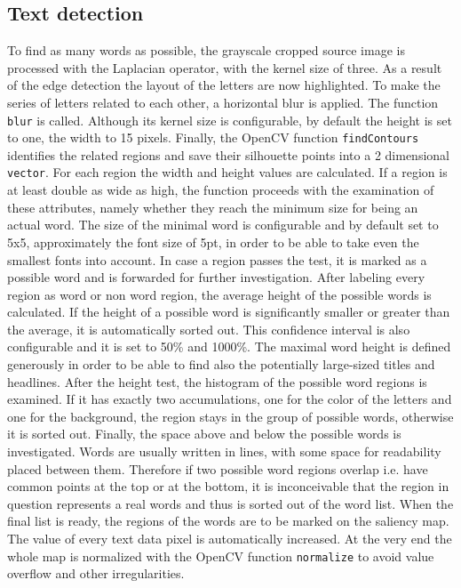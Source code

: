 \documentclass[draft,final]{vutinfth} %
\begin{document}
	\subsection{Text detection}
	To find as many words as possible, the grayscale cropped source image is processed with the Laplacian operator, with the kernel size of three.
	As a result of the edge detection the layout of the letters are now highlighted.
	To make the series of letters related to each other, a horizontal blur is applied.
	The function \texttt{blur} is called. 
	Although its kernel size is configurable, by default the height is set to one, the width to 15 pixels.
	Finally, the OpenCV function  \texttt{findContours} identifies the related regions and save their silhouette points into a 2 dimensional \texttt{vector}.
	For each region the width and height values are calculated.
	If a region is at least double as wide as high, the function proceeds with the examination of these attributes, namely whether they reach the minimum size for being an actual word.
	The size of the minimal word is configurable and by default set to 5x5, approximately the font size of 5pt, in order to be able to take even the smallest fonts into account.
	In case a region passes the test, it is marked as a possible word and is forwarded for further investigation.
	After labeling every region as word or non word region, the average height of the possible words is calculated.
	If the height of a possible word is significantly smaller or greater than the average, it is automatically sorted out.
	This confidence interval is also configurable and it is set to 50\% and 1000\%. 
	The maximal word height is defined generously in order to be able to find also the potentially large-sized titles and headlines.
	After the height test, the histogram of the possible word regions is examined.
	If it has exactly two accumulations, one for the color of the letters and one for the background, the region stays in the group of possible words, otherwise it is sorted out.
	Finally, the space above and below the possible words is investigated.
	Words are usually written in lines, with some space for readability placed between them. 
	Therefore if two possible word regions overlap i.e. have  common points at the top or at the bottom, it is inconceivable that the region in question represents a real words and thus is sorted out of the word list.
	When the final list is ready, the regions of the words are to be marked on the saliency map.
	The value of every text data pixel is automatically increased.
	At the very end the whole map is normalized with the OpenCV function \texttt{normalize} to avoid value overflow and other irregularities.  
	
\end{document}
